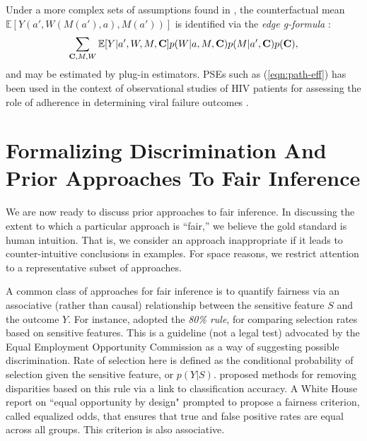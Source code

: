 \documentclass[letterpaper]{article} %
\newcommand{\citep}{\cite}
\begin{document}
Under a more complex sets of assumptions found in \citep{shpitser13cogsci}, the counterfactual mean $\mathbb{E}[Y(a', W(M(a'),a), M(a'))]$ is identified via the \emph{edge g-formula} \citep{shpitser15hierarchy}:
{\small
\begin{equation}
\sum_{{\bf C},M,W} \mathbb{E}[Y | a', W,M,{\bf C}] p(W | a, M, {\bf C}) p(M | a', {\bf C}) p({\bf C}),
\label{eqn:edge-g-2}
\end{equation}
}
and may be estimated by plug-in estimators. PSEs such as (\ref{eqn:path-eff}) has been used in the context of observational studies of HIV patients for assessing the role of adherence in determining viral failure outcomes \citep{miles17quantifying}.


\section{Formalizing Discrimination And Prior Approaches To Fair Inference}
\label{sec:philosophy}

We are now ready to discuss prior approaches to fair inference.  In discussing the extent to which a particular approach is ``fair,''
we believe the gold standard is human intuition.  That is, we consider an approach inappropriate if it leads to counter-intuitive conclusions in examples.
For space reasons, we restrict attention to a representative subset of approaches.

A common class of approaches for fair inference is to quantify fairness via an associative (rather than causal) relationship between the sensitive feature $S$ and the outcome $Y$. 
For instance, \citep{feldman15certifying} adopted the \emph{80\% rule}, for comparing selection rates based on sensitive features.
This is a guideline (not a legal test) advocated by the Equal Employment Opportunity Commission \citep{EEOC} as a way of suggesting possible discrimination.
Rate of selection here is defined as the conditional probability of selection given the sensitive feature, or $p(Y | S)$.
\citep{feldman15certifying} proposed methods for removing disparities based on this rule via a link to classification accuracy.
A White House report on ``equal opportunity by design" \citep{WH} prompted \citep{hardt16equality} to propose a fairness criterion, called equalized odds, that ensures that true and false positive rates are equal across all groups.  This criterion is also associative. 
\end{document}
